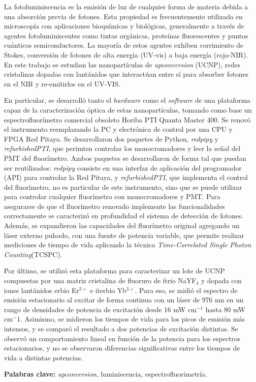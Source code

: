 
La fotoluminiscencia es la emisión de luz de cualquier forma de materia debida a una absorción previa de fotones. 
Esta propiedad es frecuentemente utilizada en microscopía con aplicaciones bioquímicas y biológicas, generalmente a través de agentes fotoluminiscentes como tintas orgánicas, proteínas fluorescentes y puntos cuánticos semiconductores. 
La mayoría de estos agentes exhiben corrimiento de Stokes, conversión de fotones de alta energía (UV-vis) a baja energía (rojo-NIR).
En este trabajo se estudian las nanopartículas de \textit{upconversion} (UCNP), redes cristalinas dopadas con lantánidos que interactúan entre sí para absorber fotones en el NIR y re-emitirlos en el UV-VIS.

En particular, se desarrolló tanto el \textit{hardware} como el \textit{software} de una plataforma capaz de la caracterización óptica de estas nanopartículas, tomando como base un espectrofluorímetro comercial obsoleto Horiba PTI Quanta Master 400.
Se renovó el instrumento reemplazando la PC y electrónica de control por una CPU y FPGA Red Pitaya.
Se desarrollaron dos paquetes de Python, \textit{redpipy} y \textit{refurbishedPTI}, que perimten controlar los monocromadores y leer la señal del PMT del fluorímetro.
Ambos paquetes se desarrollaron de forma tal que puedan ser reutilizados: \textit{redpipy} consiste en una interfaz de aplicación del programador (API) para controlar la Red Pitaya, y \textit{refurbishedPTI}, que implementa el control del fluorímetro, no es particular de este instrumento, sino que se puede utilizar para controlar cualquier fluorímetro con monocromadores y PMT.
Para asegurarse de que el fluorímetro renovado implemente las funcionalidades correctamente se caracterizó en profundidad el sistema de detección de fotones.
Además, se expandieron las capacidades del fluorímetro original agregando un láser externo pulsado, con una fuente de potencia variable, que permite realizar mediciones de tiempo de vida aplicando la técnica \textit{Time-Correlated Single Photon Counting}(TCSPC).

Por último, se utilizó esta plataforma para caracterizar un lote de UCNP compuestas por una matriz cristalina de fluoruro de ítrio NaYF$_4$ y dopada con iones lantánidos erbio Er$^{3+}$ e iterbio Yb$^{3+}$.
Para eso, se midió el espectro de emisión estacionario al excitar de forma continua con un láser de 976 nm en un rango de densidades de potencia de excitación desde 16 mW cm$^{-1}$ hasta 80 mW cm$^-1$.
Asimismo, se midieron los tiempos de vida para los picos de emisión más intensos, y se comparó el resultado a dos potencias de excitación distintas.
Se observó un comportamiento lineal en función de la potencia para los espectros estacionarios, y no se observaron diferencias significativas entre los tiempos de vida a distintas potencias.

\textbf{Palabras clave:} \textit{upconversion}, luminiscencia, espectrofluorimetría.




